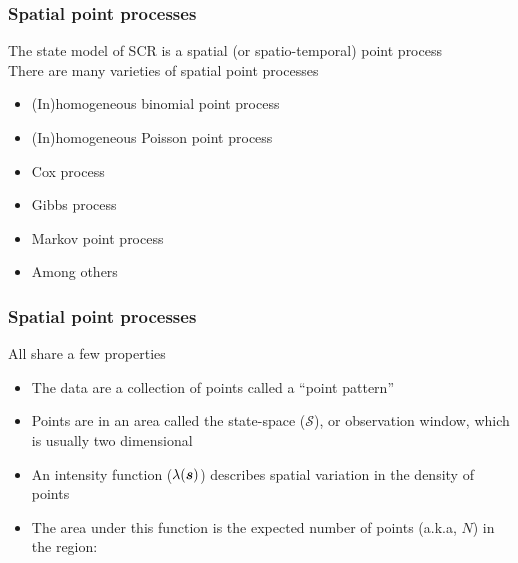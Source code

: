 \documentclass[color=usenames,dvipsnames]{beamer}\usepackage[]{graphicx}\usepackage[]{color}
\begin{document}
\begin{frame}
  \frametitle{Spatial point processes}
  {\centering \large
    The state model of SCR is a spatial (or spatio-temporal) point process \\}
  \vfill
  \pause
  There are many varieties of spatial point processes \\
  \begin{itemize}
    \item (In)homogeneous binomial point process
    \item (In)homogeneous Poisson point process
    \item Cox process
    \item Gibbs process
    \item Markov point process
    \item Among others
  \end{itemize}
\end{frame}





\begin{frame}
  \frametitle{Spatial point processes}
  All share a few properties \\
  \begin{itemize}%
    \item<1-> The data are a collection of points called a ``point pattern''
    \item<2-> Points are in an area called the state-space
      ($\mathcal{S}$), or observation window, which is usually two
      dimensional  
    \item<3-> An intensity function ($\lambda({\bm s})$) describes spatial
      variation in the density of points
    \item<4-> The area under this function is the expected number of
      points (a.k.a, $N$) in the region:
  \end{itemize}
  \vfill
\end{frame}
\end{document}
